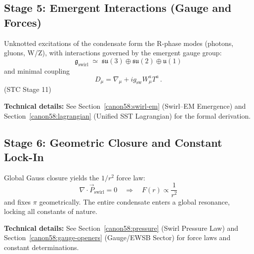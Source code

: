 \documentclass[10pt,reprint,aps,onecolumn,nofootinbib]{revtex4-2}
\begin{document}
\subsection*{Stage 5: Emergent Interactions (Gauge and Forces)}
Unknotted excitations of the condensate form the R-phase modes (photons, gluons, W/Z),
with interactions governed by the emergent gauge group:
\[
\mathfrak{g}_{\mathrm{swirl}} \;\simeq\;
\mathfrak{su}(3) \oplus \mathfrak{su}(2) \oplus \mathfrak{u}(1)
\]
and minimal coupling
\[
D_\mu = \nabla_\mu + i g_{\mathrm{sw}} W_{\mu}^{a}T^{a}\,.
\]
\hfill (STC Stage 11)

\textbf{Technical details:} See Section~\ref{canon58:swirl-em} (Swirl–EM Emergence) and Section~\ref{canon58:lagrangian} (Unified SST Lagrangian) for the formal derivation.

\subsection*{Stage 6: Geometric Closure and Constant Lock-In}
Global Gauss closure yields the $1/r^{2}$ force law:
\[
\nabla \cdot \vec{P}_{\mathrm{swirl}} = 0
\quad\Rightarrow\quad
F(r) \propto \frac{1}{r^{2}}
\]
and fixes $\pi$ geometrically.
The entire condensate enters a global resonance, locking all constants of nature.

\textbf{Technical details:} See Section~\ref{canon58:pressure} (Swirl Pressure Law) and Section~\ref{canon58:gauge-openers} (Gauge/EWSB Sector) for force laws and constant determinations.
\end{document}
